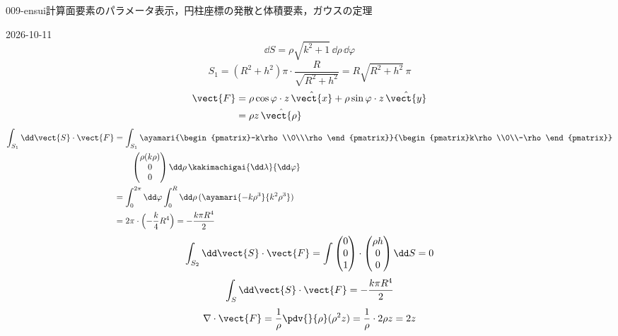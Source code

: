 \documentclass[uplatex,dvipdfmx,a4paper,11pt]{jsarticle}
\begin{document}
\begin{mondai}{009-ensui}{計算}{面要素のパラメータ表示，円柱座標の発散と体積要素，ガウスの定理}
\begin{kotaeutsushi}{2026-10-11}
\[ \dd S=\rho\sqrt{k^{2}+1}\,\dd\rho\,\dd\varphi \]
\[ S_{1}=(R^{2}+h^{2})\pi\cdot\frac{R}{\sqrt{R^{2}+h^{2}}}=R\sqrt{R^{2}+h^{2}}\,\pi \]
\begin{align*}
\vect{F}&=\rho\cos\varphi\cdot z\,\hat{\vect{x}}+\rho\sin\varphi\cdot z\,\hat{\vect{y}}\\
&=\rho z\,\hat{\vect{\rho}}
\end{align*}
\begin{align*}
\int_{S_{1}}\dd\vect{S}\cdot\vect{F}&=\int_{S_{1}}\ayamari{\begin{pmatrix}-k\rho\\0\\\rho\end{pmatrix}}{\begin{pmatrix}k\rho\\0\\-\rho\end{pmatrix}}\\
&\qquad\begin{pmatrix}\rho(k\rho)\\0\\0\end{pmatrix}\dd\rho\,\kakimachigai{\dd\lambda}{\dd\varphi}\\
&=\int_{0}^{2\pi}\dd\varphi\int_{0}^{R}\dd\rho\,(\ayamari{-k\rho^{3}}{k^{2}\rho^{3}})\\
&=2\pi\cdot\Bigl(-\frac{k}{4}R^{4}\Bigr)=-\frac{k\pi R^{4}}{2}
\end{align*}
\[ \int_{S_{2}}\dd\vect{S}\cdot\vect{F}=\int\begin{pmatrix}0\\0\\1\end{pmatrix}\cdot\begin{pmatrix}\rho h\\0\\0\end{pmatrix}\dd S=0 \]
\[ \int_{S}\dd\vect{S}\cdot\vect{F}=-\frac{k\pi R^{4}}{2} \]
\[ \nabla\cdot\vect{F}=\frac{1}{\rho}\pdv{}{\rho}(\rho^{2}z)=\frac{1}{\rho}\cdot2\rho z=2z \]

\end{kotaeutsushi}
\end{mondai}
\end{document}
